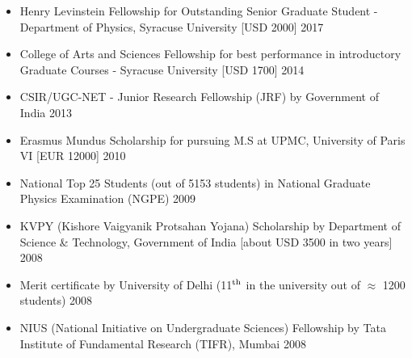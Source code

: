 
 \begin{itemize}
 \item Henry Levinstein Fellowship for Outstanding Senior Graduate Student - Department of Physics, Syracuse University [USD 2000] \hfill 2017 
\item  College of Arts and Sciences Fellowship for best performance in introductory Graduate Courses - Syracuse University [USD 1700] \hfill 2014 
 \item CSIR/UGC-NET - Junior Research Fellowship (JRF) by Government of India \hfill 2013
 \item Erasmus Mundus Scholarship for pursuing M.S at UPMC, University of Paris VI  [EUR 12000] \hfill \textsc{2010}
 \item National Top 25 Students (out of 5153 students) in National Graduate Physics Examination (NGPE) \hfill \textsc{2009}
  \item KVPY (Kishore Vaigyanik Protsahan Yojana) Scholarship by Department of Science \& Technology, Government of India [about USD 3500 in two years] \hfill 2008
 \item Merit certificate by University of Delhi (11$^{\rm{th}}$ in the university out of $\approx$ 1200 students) \hfill 2008
 \item NIUS (National Initiative on Undergraduate Sciences) Fellowship by Tata Institute of Fundamental Research (TIFR), Mumbai  \hfill 2008
 \end{itemize} 
